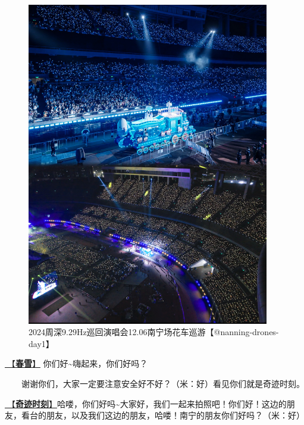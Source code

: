 \documentclass[]{ctexbook}
\begin{document}
\begin{figure}

{\centering \includegraphics[width=300pt]{img/nanning20241206/003} 

}

\caption{2024周深9.29Hz巡回演唱会12.06南宁场花车巡游【@nanning-drones-day1】}\label{fig:unnamed-chunk-138}
\end{figure}

\hyperref[spring-snow]{🎵【\textbf{春雪}】} 你们好\textasciitilde 嗨起来，你们好吗？

  谢谢你们，大家一定要注意安全好不好？（米：好）看见你们就是奇迹时刻。

\hyperref[magic-moment]{🎵【\textbf{奇迹时刻}】}哈喽，你们好吗\textasciitilde 大家好，我们一起来拍照吧！你们好！这边的朋友，看台的朋友，以及我们这边的朋友，哈喽！南宁的朋友你们好吗？（米：好）
\end{document}

